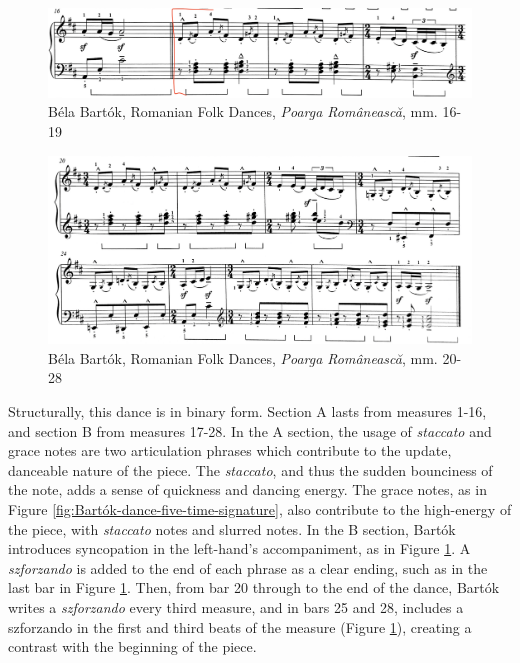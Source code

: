\begin{figure}
  \centering
  \includegraphics[width=\textwidth]{figures/bartok-dance-five-b-section.jpg}
  \caption{Béla Bartók, Romanian Folk Dances, \textit{Poarga Românească}, mm. 16-19}
  \label{fig:Bartók-dance-five-b-section}
\end{figure}

\begin{figure}
  \centering
  \includegraphics[width=\textwidth]{figures/bartok-dance-five-ending.jpg}
  \caption{Béla Bartók, Romanian Folk Dances, \textit{Poarga Românească}, mm. 20-28}
  \label{fig:Bartók-dance-five-ending}
\end{figure}

Structurally, this dance is in binary form. Section A lasts from measures 1-16, and section B from measures 17-28. In the A section, the usage of \textit{staccato} and grace notes are two articulation phrases which contribute to the update, danceable nature of the piece. The \textit{staccato}, and thus the sudden bounciness of the note, adds a sense of quickness and dancing energy. The grace notes, as in Figure \ref{fig:Bartók-dance-five-time-signature}\autocite{Lung_2016}, also contribute to the high-energy of the piece, with \textit{staccato} notes and slurred notes. In the B section, Bartók introduces syncopation in the left-hand's accompaniment, as in Figure \ref{fig:Bartók-dance-five-b-section}\autocite{Lung_2016}. A \textit{szforzando} is added to the end of each phrase as a clear ending, such as in the last bar in Figure \ref{fig:Bartók-dance-five-b-section}\autocite{Lung_2016}. Then, from bar 20 through to the end of the dance, Bartók writes a \textit{szforzando} every third measure, and in bars 25 and 28, includes a szforzando in the first and third beats of the measure (Figure \ref{fig:Bartók-dance-five-b-section}\autocite{Lung_2016}), creating a contrast with the beginning of the piece. 

